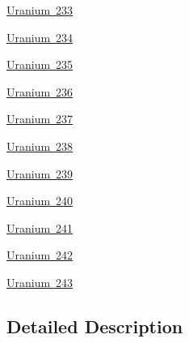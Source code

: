 \begin{DoxyCompactItemize}
\item 
\mbox{\hyperlink{group___isotope_const-_uranium-_u233}{Uranium 233}}
\item 
\mbox{\hyperlink{group___isotope_const-_uranium-_u234}{Uranium 234}}
\item 
\mbox{\hyperlink{group___isotope_const-_uranium-_u235}{Uranium 235}}
\item 
\mbox{\hyperlink{group___isotope_const-_uranium-_u236}{Uranium 236}}
\item 
\mbox{\hyperlink{group___isotope_const-_uranium-_u237}{Uranium 237}}
\item 
\mbox{\hyperlink{group___isotope_const-_uranium-_u238}{Uranium 238}}
\item 
\mbox{\hyperlink{group___isotope_const-_uranium-_u239}{Uranium 239}}
\item 
\mbox{\hyperlink{group___isotope_const-_uranium-_u240}{Uranium 240}}
\item 
\mbox{\hyperlink{group___isotope_const-_uranium-_u241}{Uranium 241}}
\item 
\mbox{\hyperlink{group___isotope_const-_uranium-_u242}{Uranium 242}}
\item 
\mbox{\hyperlink{group___isotope_const-_uranium-_u243}{Uranium 243}}
\end{DoxyCompactItemize}


\subsection{Detailed Description}
